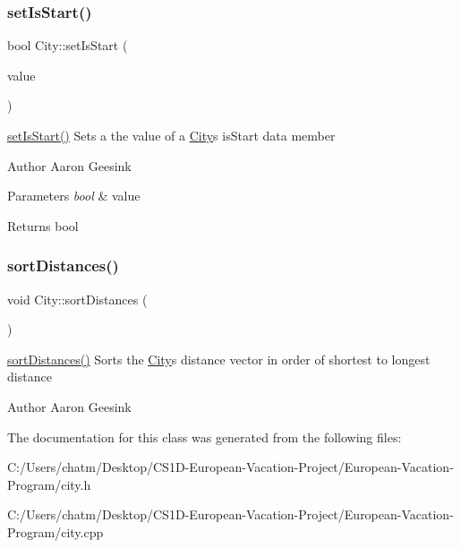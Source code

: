 \subsubsection{\texorpdfstring{setIsStart()}{setIsStart()}}
{\footnotesize\ttfamily bool City\+::set\+Is\+Start (\begin{DoxyParamCaption}\item[{bool}]{value }\end{DoxyParamCaption})}



\mbox{\hyperlink{class_city_a9fcdb0c59ac7760dd3996803ddb6bf86}{set\+Is\+Start()}} Sets a the value of a \mbox{\hyperlink{class_city}{City}}\textquotesingle{}s is\+Start data member 

\begin{DoxyAuthor}{Author}
Aaron Geesink 
\end{DoxyAuthor}

\begin{DoxyParams}{Parameters}
{\em bool} & value \\
\hline
\end{DoxyParams}
\begin{DoxyReturn}{Returns}
bool 
\end{DoxyReturn}
\mbox{\label{class_city_a9e3da459f9dcf61ae1a4551d79abafb8}} 
\subsubsection{\texorpdfstring{sortDistances()}{sortDistances()}}
{\footnotesize\ttfamily void City\+::sort\+Distances (\begin{DoxyParamCaption}{ }\end{DoxyParamCaption})}



\mbox{\hyperlink{class_city_a9e3da459f9dcf61ae1a4551d79abafb8}{sort\+Distances()}} Sorts the \mbox{\hyperlink{class_city}{City}}\textquotesingle{}s distance vector in order of shortest to longest distance 

\begin{DoxyAuthor}{Author}
Aaron Geesink 
\end{DoxyAuthor}


The documentation for this class was generated from the following files\+:\begin{DoxyCompactItemize}
\item 
C\+:/\+Users/chatm/\+Desktop/\+C\+S1\+D-\/\+European-\/\+Vacation-\/\+Project/\+European-\/\+Vacation-\/\+Program/city.\+h\item 
C\+:/\+Users/chatm/\+Desktop/\+C\+S1\+D-\/\+European-\/\+Vacation-\/\+Project/\+European-\/\+Vacation-\/\+Program/city.\+cpp\end{DoxyCompactItemize}
